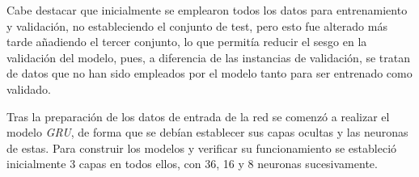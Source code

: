 
Cabe destacar que inicialmente se emplearon todos los datos para entrenamiento y validación, no estableciendo
el conjunto de test, pero esto fue alterado más tarde añadiendo el tercer conjunto, lo que 
permitía reducir el sesgo en la validación del modelo, pues, a diferencia de las instancias de validación, se tratan
de datos que no han sido empleados por el modelo tanto para ser entrenado como validado.

Tras la preparación de los datos de entrada de la red se comenzó a realizar el modelo \textit{GRU}, de forma
que se debían establecer sus capas ocultas y las neuronas de estas.
Para construir los modelos y verificar su funcionamiento se estableció inicialmente 3 capas en todos ellos, con
36, 16 y 8 neuronas sucesivamente.

